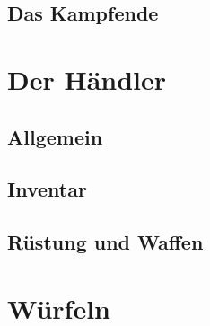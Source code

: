 \documentclass[11pt, a4paper, german]{article}
\begin{document}
\subsection{Das Kampfende}

\section{Der Händler}
\subsection{Allgemein}
\subsection{Inventar}
\subsection{Rüstung und Waffen}

\section{Würfeln}
\end{document}
